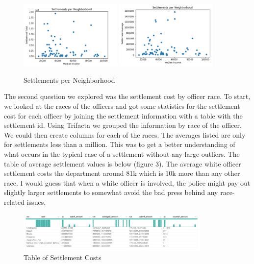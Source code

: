 \documentclass[11pt]{article}
\begin{document}
\begin{figure}[h!]
\centering
\caption{Settlements per Neighborhood}
\includegraphics[width=0.45\textwidth]{settle1.png}
\includegraphics[width=0.45\textwidth]{settle2.png}
\end{figure}

The second question we explored was the settlement cost by officer race. To start, we looked at the races of the officers and got some statistics for the settlement cost for each officer by joining the settlement information with a table with the settlement id. Using Trifacta we grouped the information by race of the officer. We could then create columns for each of the races. The averages listed are only for settlements less than a million. This was to get a better understanding of what occurs in the typical case of a settlement without any large outliers. The table of average settlement values is below (figure 3). The average white officer settlement costs the department around 81k which is 10k more than any other race. I would guess that when a white officer is involved, the police might pay out slightly larger settlements to somewhat avoid the bad press behind any
race-related issues. 

\begin{figure}[h!]
\centering
\caption{Table of Settlement Costs}
\includegraphics[width=0.85\textwidth]{RaceTable.PNG}
\end{figure}
\end{document}
